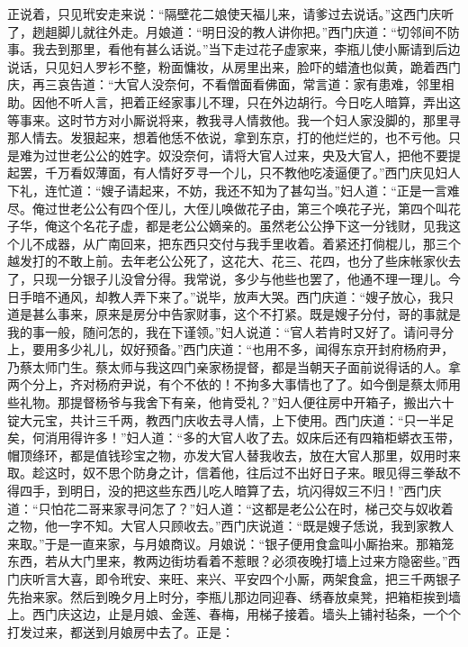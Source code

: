 正说着，只见玳安走来说：“隔壁花二娘使天福儿来，请爹过去说话。”这西门庆听了，趔趄脚儿就往外走。月娘道：“明日没的教人讲你把。”西门庆道：“切邻间不防事。我去到那里，看他有甚么话说。”当下走过花子虚家来，李瓶儿使小厮请到后边说话，只见妇人罗衫不整，粉面慵妆，从房里出来，脸吓的蜡渣也似黄，跪着西门庆，再三哀告道：“大官人没奈何，不看僧面看佛面，常言道：家有患难，邻里相助。因他不听人言，把着正经家事儿不理，只在外边胡行。今日吃人暗算，弄出这等事来。这时节方对小厮说将来，教我寻人情救他。我一个妇人家没脚的，那里寻那人情去。发狠起来，想着他恁不依说，拿到东京，打的他烂烂的，也不亏他。只是难为过世老公公的姓字。奴没奈何，请将大官人过来，央及大官人，把他不要提起罢，千万看奴薄面，有人情好歹寻一个儿，只不教他吃凌逼便了。”西门庆见妇人下礼，连忙道：“嫂子请起来，不妨，我还不知为了甚勾当。”妇人道：“正是一言难尽。俺过世老公公有四个侄儿，大侄儿唤做花子由，第三个唤花子光，第四个叫花子华，俺这个名花子虚，都是老公公嫡亲的。虽然老公公挣下这一分钱财，见我这个儿不成器，从广南回来，把东西只交付与我手里收着。着紧还打倘棍儿，那三个越发打的不敢上前。去年老公公死了，这花大、花三、花四，也分了些床帐家伙去了，只现一分银子儿没曾分得。我常说，多少与他些也罢了，他通不理一理儿。今日手暗不通风，却教人弄下来了。”说毕，放声大哭。西门庆道：“嫂子放心，我只道是甚么事来，原来是房分中告家财事，这个不打紧。既是嫂子分付，哥的事就是我的事一般，随问怎的，我在下谨领。”妇人说道：“官人若肯时又好了。请问寻分上，要用多少礼儿，奴好预备。”西门庆道：“也用不多，闻得东京开封府杨府尹，乃蔡太师门生。蔡太师与我这四门亲家杨提督，都是当朝天子面前说得话的人。拿两个分上，齐对杨府尹说，有个不依的！不拘多大事情也了了。如今倒是蔡太师用些礼物。那提督杨爷与我舍下有亲，他肯受礼？”妇人便往房中开箱子，搬出六十锭大元宝，共计三千两，教西门庆收去寻人情，上下使用。西门庆道：“只一半足矣，何消用得许多！”妇人道：“多的大官人收了去。奴床后还有四箱柜蟒衣玉带，帽顶绦环，都是值钱珍宝之物，亦发大官人替我收去，放在大官人那里，奴用时来取。趁这时，奴不思个防身之计，信着他，往后过不出好日子来。眼见得三拳敌不得四手，到明日，没的把这些东西儿吃人暗算了去，坑闪得奴三不归！”西门庆道：“只怕花二哥来家寻问怎了？”妇人道：“这都是老公公在时，梯己交与奴收着之物，他一字不知。大官人只顾收去。”西门庆说道：“既是嫂子恁说，我到家教人来取。”于是一直来家，与月娘商议。月娘说：“银子便用食盒叫小厮抬来。那箱笼东西，若从大门里来，教两边街坊看着不惹眼？必须夜晚打墙上过来方隐密些。”西门庆听言大喜，即令玳安、来旺、来兴、平安四个小厮，两架食盒，把三千两银子先抬来家。然后到晚夕月上时分，李瓶儿那边同迎春、绣春放桌凳，把箱柜挨到墙上。西门庆这边，止是月娘、金莲、春梅，用梯子接着。墙头上铺衬毡条，一个个打发过来，都送到月娘房中去了。正是：


